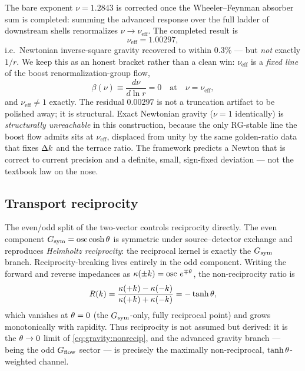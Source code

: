 The bare exponent $\nu=1.2843$ is corrected once the Wheeler--Feynman absorber sum is completed: summing the advanced response over the full ladder of downstream shells renormalizes $\nu\to\nu_{\mathrm{eff}}$. The completed result is
\begin{equation}
\nu_{\mathrm{eff}}=1.00297 ,
\label{eq:gravity:nueff}
\end{equation}
i.e.\ Newtonian inverse-square gravity recovered to within $0.3\%$ — but \emph{not} exactly $1/r$. We keep this as an honest bracket rather than a clean win: $\nu_{\mathrm{eff}}$ is a \emph{fixed line} of the boost renormalization-group flow,
\begin{equation}
\beta(\nu)\equiv\frac{d\nu}{d\ln r}=0 \quad\text{at}\quad \nu=\nu_{\mathrm{eff}} ,
\label{eq:gravity:beta}
\end{equation}
and $\nu_{\mathrm{eff}}\neq 1$ exactly. The residual $0.00297$ is not a truncation artifact to be polished away; it is structural. Exact Newtonian gravity ($\nu=1$ identically) is \emph{structurally unreachable} in this construction, because the only RG-stable line the boost flow admits sits at $\nu_{\mathrm{eff}}$, displaced from unity by the same golden-ratio data that fixes $\Delta k$ and the terrace ratio. The framework predicts a Newton that is correct to current precision and a definite, small, sign-fixed deviation — not the textbook law on the nose.

\subsection{Transport reciprocity}

The even/odd split of the two-vector controls reciprocity directly. The even component $G_{\mathrm{sym}}=\operatorname{osc}\cosh\theta$ is symmetric under source--detector exchange and reproduces \emph{Helmholtz reciprocity}: the reciprocal kernel is exactly the $G_{\mathrm{sym}}$ branch. Reciprocity-breaking lives entirely in the odd component. Writing the forward and reverse impedances as $\kappa(\pm k)=\operatorname{osc}\,e^{\mp\theta}$, the non-reciprocity ratio is
\begin{equation}
R(k)=\frac{\kappa(+k)-\kappa(-k)}{\kappa(+k)+\kappa(-k)}=-\tanh\theta ,
\label{eq:gravity:nonrecip}
\end{equation}
which vanishes at $\theta=0$ (the $G_{\mathrm{sym}}$-only, fully reciprocal point) and grows monotonically with rapidity. Thus reciprocity is not assumed but derived: it is the $\theta\to 0$ limit of \eqref{eq:gravity:nonrecip}, and the advanced gravity branch — being the odd $G_{\mathrm{flow}}$ sector — is precisely the maximally non-reciprocal, $\tanh\theta$-weighted channel.
